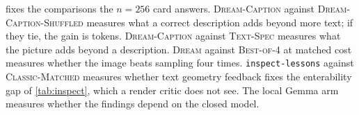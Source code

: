 \begin{table}[t]
\centering
\footnotesize
\setlength{\tabcolsep}{3pt}
\caption{\textbf{Controls and the $n{=}256$ card.} Each row isolates one component. All rows use the 256 prompts of \cref{sec:setup}.}
\label{tab:controls}
\end{table}

 fixes the comparisons the $n{=}256$ card answers. 
\textsc{Dream-Caption} against \textsc{Dream-Caption-Shuffled} measures what a correct description adds beyond more text; if they tie, the gain is tokens. %
\textsc{Dream-Caption} against \textsc{Text-Spec} measures what the picture adds beyond a description.
\textsc{Dream} against \textsc{Best-of-4} at matched cost measures whether the image beats sampling four times. %
\texttt{inspect-lessons} against \textsc{Classic-Matched} measures whether text geometry feedback fixes the enterability gap of \cref{tab:inspect}, which a render critic does not see. %
The local Gemma arm measures whether the findings depend on the closed model. %

